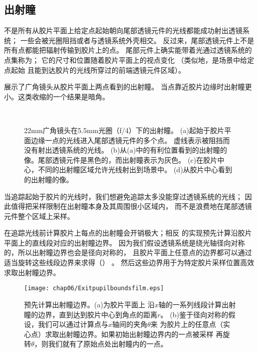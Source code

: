 \subsection{出射瞳}\label{sub:出射瞳}
不是所有从胶片平面上给定点起始朝向尾部透镜元件的光线都能成功射出透镜系统；
一些会被光圈阻挡或者与透镜系统外壳相交。
反过来，尾部透镜元件上不是所有点都能把辐射传输到胶片上的点。
尾部元件上确实能带着光通过透镜系统的点集称为；
它的尺寸和位置随着胶片平面上的视点变化
（类似地，是场景中给定点起始
且能到达胶片的光线所穿过的前端透镜元件区域）。

展示了广角镜头从胶片平面上两点看到的出射瞳。
当点靠近胶片边缘时出射瞳更小。这类收缩的一个结果是暗角。
\begin{figure}[htbp]
    \centering
    \qquad
    \\
    \qquad
    \caption{22mm广角镜头在5.5mm光圈（f/4）下的出射瞳。
        (a)起始于胶片平面边缘一点的光线进入尾部透镜元件的多个点。
        虚线表示被阻挡而没有射出透镜系统的光线。
        (b)从(a)中的有利位置看到的出射瞳的像。尾部透镜元件是黑色的，而出射瞳表示为灰色。
        (c)在胶片中心，不同的出射瞳区域允许光线射出到场景中。
        (d)从胶片中心看到的出射瞳的像。}
    \label{fig:6.21}
\end{figure}

当追踪起始于胶片的光线时，我们想避免追踪太多没能穿过透镜系统的光线；
因此值得把采样限制在出射瞳本身及其周围很小区域内，
而不是浪费地在尾部透镜元件整个区域上采样。

在追踪光线前计算胶片上每点的出射瞳会开销极大；相反
的实现预先计算沿胶片平面上的直线段对应的出射瞳边界。
因为我们假设透镜系统是绕光轴径向对称的，所以出射瞳边界也会是径向对称的，
且胶片平面上任意点的边界都可以通过适当旋转这些线段边界来求得（）
。
然后这些边界用于为特定胶片采样位置高效求取出射瞳边界。
\begin{figure}[htbp]
    \centering\texttt{[image: chap06/Exitpupilboundsfilm.eps]}
    \caption{预先计算出射瞳边界。(a)为胶片平面上
        沿$x$轴的一系列线段计算出射瞳的边界，直到达到胶片中心到角点的距离$r$。
        (b)鉴于径向对称的假设，我们可以通过计算点与$x$轴间的夹角$\theta$来
        为胶片上的任意点（实心点）求取出射瞳边界。如果初始出射瞳边界内的一点被采样
        再旋转$\theta$，则我们就有了原始点处出射瞳内的一点。}
    \label{fig:6.22}
\end{figure}

